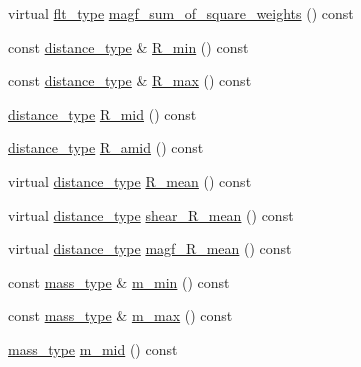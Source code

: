 \begin{DoxyCompactItemize}
\item 
virtual \hyperlink{lib_2IceBRG__main_2common_8h_ad0f130a56eeb944d9ef2692ee881ecc4}{flt\-\_\-type} \hyperlink{classIceBRG_1_1pair__bin__summary_adaabe872405c1f389f340a377725a2c5}{magf\-\_\-sum\-\_\-of\-\_\-square\-\_\-weights} () const 
\item 
const \hyperlink{namespaceIceBRG_a45499647eb87e24c10ab32c628711cec}{distance\-\_\-type} \& \hyperlink{classIceBRG_1_1pair__bin__summary_af1ee4f7eeb70c23843a0ad4af2f41ef9}{R\-\_\-min} () const 
\item 
const \hyperlink{namespaceIceBRG_a45499647eb87e24c10ab32c628711cec}{distance\-\_\-type} \& \hyperlink{classIceBRG_1_1pair__bin__summary_a26bb6d459f592d9ff9f4a11255d5884b}{R\-\_\-max} () const 
\item 
\hyperlink{namespaceIceBRG_a45499647eb87e24c10ab32c628711cec}{distance\-\_\-type} \hyperlink{classIceBRG_1_1pair__bin__summary_a0ba020dcfebf4a714b48315af3b45768}{R\-\_\-mid} () const 
\item 
\hyperlink{namespaceIceBRG_a45499647eb87e24c10ab32c628711cec}{distance\-\_\-type} \hyperlink{classIceBRG_1_1pair__bin__summary_ad265e7f8613d5cccc12279a62521cf53}{R\-\_\-amid} () const 
\item 
virtual \hyperlink{namespaceIceBRG_a45499647eb87e24c10ab32c628711cec}{distance\-\_\-type} \hyperlink{classIceBRG_1_1pair__bin__summary_abe60c51fd11b24f2d92f9b273f291677}{R\-\_\-mean} () const 
\item 
virtual \hyperlink{namespaceIceBRG_a45499647eb87e24c10ab32c628711cec}{distance\-\_\-type} \hyperlink{classIceBRG_1_1pair__bin__summary_ab2eacfc9f48eebb9219aa6f1c573cefe}{shear\-\_\-\-R\-\_\-mean} () const 
\item 
virtual \hyperlink{namespaceIceBRG_a45499647eb87e24c10ab32c628711cec}{distance\-\_\-type} \hyperlink{classIceBRG_1_1pair__bin__summary_a17131edb4b90c3c63f386c9849419963}{magf\-\_\-\-R\-\_\-mean} () const 
\item 
const \hyperlink{namespaceIceBRG_a1be72ac4918a9b029f2eefa084213e35}{mass\-\_\-type} \& \hyperlink{classIceBRG_1_1pair__bin__summary_a3d298870839005a013bbb03a51a9b596}{m\-\_\-min} () const 
\item 
const \hyperlink{namespaceIceBRG_a1be72ac4918a9b029f2eefa084213e35}{mass\-\_\-type} \& \hyperlink{classIceBRG_1_1pair__bin__summary_a385862dcbf0238834d8638a9e79c37fd}{m\-\_\-max} () const 
\item 
\hyperlink{namespaceIceBRG_a1be72ac4918a9b029f2eefa084213e35}{mass\-\_\-type} \hyperlink{classIceBRG_1_1pair__bin__summary_a4e17e3e5675622afcb9882013a539b84}{m\-\_\-mid} () const 

\end{DoxyCompactItemize}
